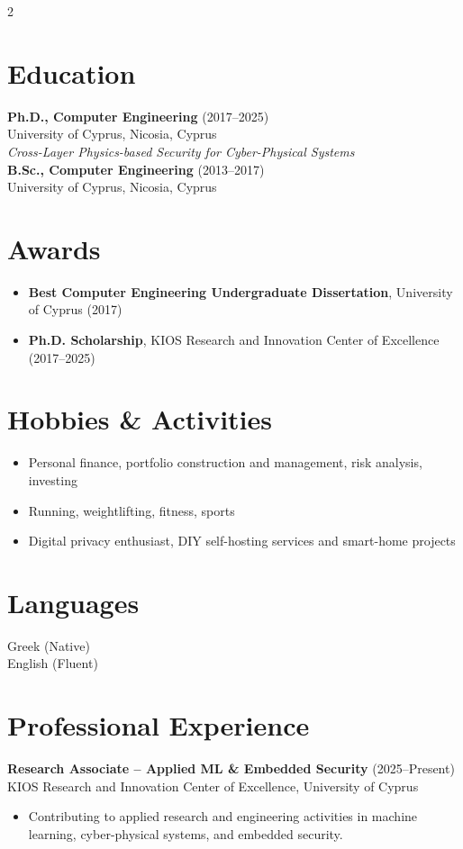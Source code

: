 \documentclass[10pt,a4paper]{article}
\begin{document}
\begin{multicols}{2}
\section*{Education}
\textbf{Ph.D., Computer Engineering} (2017--2025)\\
University of Cyprus, Nicosia, Cyprus\\
\textit{Cross-Layer Physics-based Security for Cyber-Physical Systems}\\[4pt]

\textbf{B.Sc., Computer Engineering} (2013--2017)\\
University of Cyprus, Nicosia, Cyprus

\section*{Awards}
\begin{itemize}
  \item \textbf{Best Computer Engineering Undergraduate Dissertation}, University of Cyprus (2017)
  \item \textbf{Ph.D. Scholarship}, KIOS Research and Innovation Center of Excellence (2017--2025)
\end{itemize}

\section*{Hobbies \& Activities}
\begin{itemize}
  \item Personal finance, portfolio construction and management, risk analysis, investing
  \item Running, weightlifting, fitness, sports
  \item Digital privacy enthusiast, DIY self-hosting services and smart-home projects
\end{itemize}

\section*{Languages}
Greek (Native)\\
English (Fluent)

\section*{Professional Experience}
\textbf{Research Associate -- Applied ML \& Embedded Security} (2025--Present)\\
KIOS Research and Innovation Center of Excellence, University of Cyprus
\begin{itemize}
  \item Contributing to applied research and engineering activities in machine learning, cyber-physical systems, and embedded security.
\end{itemize}


\end{multicols}
\end{document}

